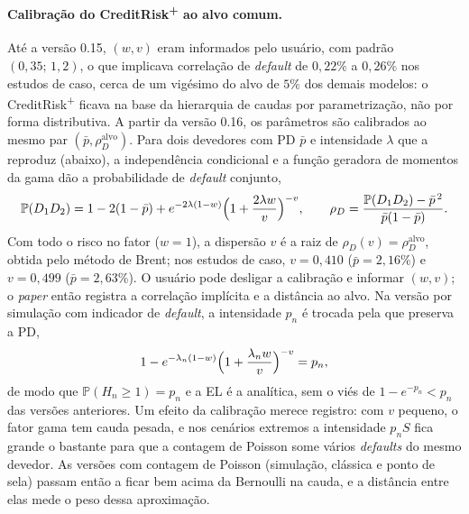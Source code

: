 \documentclass[11pt,a4paper]{article}
\newcommand{\Prob}{\mathbb{P}}
\begin{document}
\paragraph{Calibração do CreditRisk\textsuperscript{+} ao alvo comum.} Até a versão 0.15, $(w,v)$ eram informados pelo usuário, com padrão $(0{,}35;\,1{,}2)$, o que implicava correlação de \emph{default} de $0{,}22\%$ a $0{,}26\%$ nos estudos de caso, cerca de um vigésimo do alvo de $5\%$ dos demais modelos: o CreditRisk\textsuperscript{+} ficava na base da hierarquia de caudas por parametrização, não por forma distributiva. A partir da versão 0.16, os parâmetros são calibrados ao mesmo par $(\bar p,\rho_D^{\mathrm{alvo}})$. Para dois devedores com PD $\bar p$ e intensidade $\lambda$ que a reproduz (abaixo), a independência condicional e a função geradora de momentos da gama dão a probabilidade de \emph{default} conjunto,
\begin{equation}
\Prob(D_1D_2)=1-2(1-\bar p)+e^{-2\lambda(1-w)}\Bigl(1+\frac{2\lambda w}{v}\Bigr)^{-v},\qquad
\rho_D=\frac{\Prob(D_1D_2)-\bar p^{\,2}}{\bar p(1-\bar p)}.
\label{eq:crp-rho}
\end{equation}
Com todo o risco no fator ($w=1$), a dispersão $v$ é a raiz de $\rho_D(v)=\rho_D^{\mathrm{alvo}}$, obtida pelo método de Brent; nos estudos de caso, $v=0{,}410$ ($\bar p=2{,}16\%$) e $v=0{,}499$ ($\bar p=2{,}63\%$). O usuário pode desligar a calibração e informar $(w,v)$; o \emph{paper} então registra a correlação implícita e a distância ao alvo. Na versão por simulação com indicador de \emph{default}, a intensidade $p_n$ é trocada pela que preserva a PD,
\begin{equation}
1-e^{-\lambda_n(1-w)}\Bigl(1+\frac{\lambda_n w}{v}\Bigr)^{-v}=p_n,
\label{eq:crp-lambda}
\end{equation}
de modo que $\Prob(H_n\ge1)=p_n$ e a EL é a analítica, sem o viés de $1-e^{-p_n}<p_n$ das versões anteriores. Um efeito da calibração merece registro: com $v$ pequeno, o fator gama tem cauda pesada, e nos cenários extremos a intensidade $p_nS$ fica grande o bastante para que a contagem de Poisson some vários \emph{defaults} do mesmo devedor. As versões com contagem de Poisson (simulação, clássica e ponto de sela) passam então a ficar bem acima da Bernoulli na cauda, e a distância entre elas mede o peso dessa aproximação.
\end{document}
